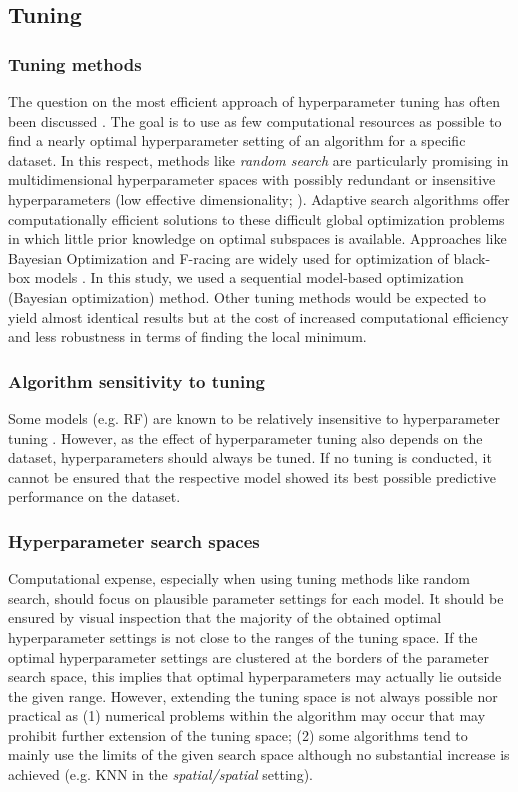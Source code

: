 \documentclass[review]{elsarticle}
\begin{document}
\subsection{Tuning}

\subsubsection{Tuning methods}
The question on the most efficient approach of hyperparameter tuning has often been discussed \citep{Bengio2000, Probst2018a, Yang2017}.
The goal is to use as few computational resources as possible to find a nearly optimal hyperparameter setting of an algorithm for a specific dataset.
In this respect, methods like \textit{random search} are particularly promising in multidimensional hyperparameter spaces with possibly redundant or insensitive hyperparameters (low effective dimensionality; \citep{Bergstra2012}).
Adaptive search algorithms offer computationally efficient solutions to these difficult global optimization problems in which little prior knowledge on optimal subspaces is available.
Approaches like Bayesian Optimization and F-racing are widely used for optimization of black-box models \citep{Birattari2002, mlrMBO, Brochu2010, Malkomes2016}.
In this study, we used a sequential model-based optimization (Bayesian optimization) method.
Other tuning methods would be expected to yield almost identical results but at the cost of increased computational efficiency and less robustness in terms of finding the local minimum.

\subsubsection{Algorithm sensitivity to tuning}
Some models (e.g. \ac{RF}) are known to be relatively insensitive to hyperparameter tuning \citep{Probst2018b}.
However, as the effect of hyperparameter tuning also depends on the dataset, hyperparameters should always be tuned.
If no tuning is conducted, it cannot be ensured that the respective model showed its best possible predictive performance on the dataset.

\subsubsection{Hyperparameter search spaces}
Computational expense, especially when using tuning methods like random search, should focus on plausible parameter settings for each model.
It should be ensured by visual inspection that the majority of the obtained optimal hyperparameter settings is not close to the ranges of the tuning space.
If the optimal hyperparameter settings are clustered at the borders of the parameter search space, this implies that optimal hyperparameters may actually lie outside the given range.
However, extending the tuning space is not always possible nor practical as (1) numerical problems within the algorithm may occur that may prohibit further extension of the tuning space; (2) some algorithms tend to mainly use the limits of the given search space although no substantial increase is achieved (e.g. KNN in the \emph{spatial/spatial} setting).
\end{document}

